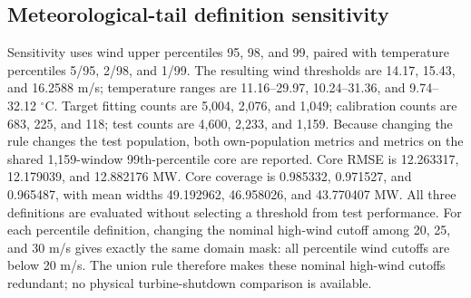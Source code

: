 \begin{table}[pos=htbp]
\centering
\color{blue}
\small
\caption{\textcolor{blue}{Weighting sensitivity at matched total loss weight; seed 0. Domain normalization and imbalance compensation are the same configuration at this scale.}}
\label{tab:chronological_weighting_interval}
\end{table}

\FloatBarrier

\subsection{Meteorological-tail definition sensitivity}
{\color{blue}Sensitivity uses wind upper percentiles 95, 98, and 99, paired with temperature percentiles 5/95, 2/98, and 1/99. The resulting wind thresholds are 14.17, 15.43, and 16.2588 m/s; temperature ranges are 11.16--29.97, 10.24--31.36, and 9.74--32.12 $^\circ$C. Target fitting counts are 5,004, 2,076, and 1,049; calibration counts are 683, 225, and 118; test counts are 4,600, 2,233, and 1,159. Because changing the rule changes the test population, both own-population metrics and metrics on the shared 1,159-window 99th-percentile core are reported. Core RMSE is 12.263317, 12.179039, and 12.882176 MW. Core coverage is 0.985332, 0.971527, and 0.965487, with mean widths 49.192962, 46.958026, and 43.770407 MW. All three definitions are evaluated without selecting a threshold from test performance. For each percentile definition, changing the nominal high-wind cutoff among 20, 25, and 30 m/s gives exactly the same domain mask: all percentile wind cutoffs are below 20 m/s. The union rule therefore makes these nominal high-wind cutoffs redundant; no physical turbine-shutdown comparison is available.}

